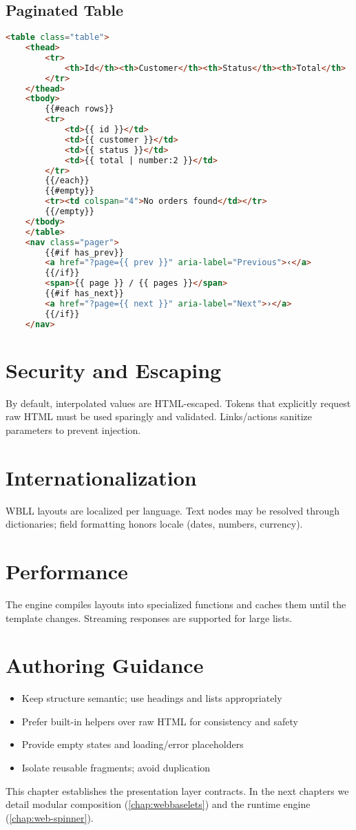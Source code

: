 \subsection{Paginated Table}
\begin{lstlisting}[language=HTML,caption={WBLL list/table (illustrative)}]
<table class="table">
	<thead>
		<tr>
			<th>Id</th><th>Customer</th><th>Status</th><th>Total</th>
		</tr>
	</thead>
	<tbody>
		{{#each rows}}
		<tr>
			<td>{{ id }}</td>
			<td>{{ customer }}</td>
			<td>{{ status }}</td>
			<td>{{ total | number:2 }}</td>
		</tr>
		{{/each}}
		{{#empty}}
		<tr><td colspan="4">No orders found</td></tr>
		{{/empty}}
	</tbody>
	</table>
	<nav class="pager">
		{{#if has_prev}}
		<a href="?page={{ prev }}" aria-label="Previous">‹</a>
		{{/if}}
		<span>{{ page }} / {{ pages }}</span>
		{{#if has_next}}
		<a href="?page={{ next }}" aria-label="Next">›</a>
		{{/if}}
	</nav>
\end{lstlisting}

\section{Security and Escaping}
\label{sec:wbll-security}

By default, interpolated values are HTML-escaped. Tokens that explicitly request raw HTML must be used sparingly and validated. Links/actions sanitize parameters to prevent injection.

\section{Internationalization}
\label{sec:wbll-i18n}

WBLL layouts are localized per language. Text nodes may be resolved through dictionaries; field formatting honors locale (dates, numbers, currency).

\section{Performance}
\label{sec:wbll-performance}

The engine compiles layouts into specialized functions and caches them until the template changes. Streaming responses are supported for large lists.

\section{Authoring Guidance}
\label{sec:wbll-guidance}

\begin{itemize}
	\item Keep structure semantic; use headings and lists appropriately
	\item Prefer built-in helpers over raw HTML for consistency and safety
	\item Provide empty states and loading/error placeholders
	\item Isolate reusable fragments; avoid duplication
\end{itemize}

This chapter establishes the presentation layer contracts. In the next chapters we detail modular composition (\cref{chap:webbaselets}) and the runtime engine (\cref{chap:web-spinner}).
